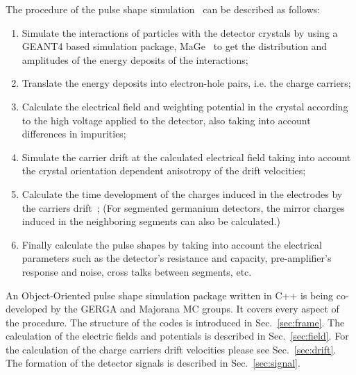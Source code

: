 The procedure of the pulse shape simulation~\cite{agata} can be described as follows:
\begin{enumerate}
\item Simulate the interactions of particles with the detector   crystals by using a GEANT4 based simulation package,   MaGe~\cite{mage} to get the distribution and amplitudes of the   energy deposits of the interactions;
\item Translate the energy deposits into electron-hole pairs, i.e.   the charge carriers;
\item Calculate the electrical field and weighting potential in the   crystal according to the high voltage applied to the detector, also   taking into account differences in impurities;
\item Simulate the carrier drift at the calculated electrical field   taking into account the crystal orientation dependent anisotropy of   the drift velocities;
\item Calculate the time development of the charges induced in the   electrodes by the carriers drift~\cite{igex}; (For segmented   germanium detectors, the mirror charges induced in the neighboring   segments can also be calculated.)
\item Finally calculate the pulse shapes by taking into account the   electrical parameters such as the detector's resistance and   capacity, pre-amplifier's response and noise, cross talks between   segments, etc.
\end{enumerate}
An Object-Oriented pulse shape simulation package written in C++ is being co-developed by the GERGA and Majorana MC groups. It covers every aspect of the procedure. The structure of the codes is introduced in Sec.~\ref{sec:frame}. The calculation of the electric fields and potentials is described in Sec.~\ref{sec:field}. For the calculation of the charge carriers drift velocities please see Sec.~\ref{sec:drift}. The formation of the detector signals is described in Sec.~\ref{sec:signal}.


